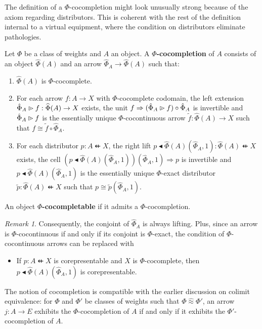 \documentclass[10pt,a4paper]{article}
\newcommand{\To}{\Rightarrow}
\newcommand{\coce}[2]{{\hat{#1}}_{#2}}
\newcommand{\coc}[2]{{\widehat{#1}}(#2)}
\newcommand{\colimeq}{\mathrel{\hat\approx}}
\newcommand{\dfrom}{\nvleftarrow}
\newcommand{\plext}{\mathbin{{\rhd}\mathclap{\mspace{-17.5mu}\cdot}}}
\newcommand{\rift}{\mathbin{\blacktriangleleft}}
\newcommand{\simeqq}{\cong}
\theoremstyle{plain}
\theoremstyle{definition}
\theoremstyle{remark}
\newtheorem{remark}[theorem]{Remark}
\begin{document}
The definition of a $\Phi$-cocompletion might look unusually strong because of the axiom regarding distributors. This is coherent with the rest of the definition internal to a virtual equipment, where the condition on distributors eliminate pathologies.

\begin{definition}
    \label{def:cocomp}
    Let $\Phi$ be a class of weights and $A$ an object. A \textbf{$\Phi$-cocompletion} of $A$ consists of an object $\coc\Phi A$ and an arrow $\coce\Phi A \to \coc\Phi A$ such that:
    \begin{enumerate}
        \item $\coc\Phi A$ is $\Phi$-cocomplete.
        \item For each arrow $f : A \to X$ with $\Phi$-cocomplete codomain, the left extension $\coce\Phi A \plext f : \coc\Phi A \to X$ exists, the unit $f \To (\coce\Phi A \plext f) \circ \coce\Phi A$ is invertible and $\coce\Phi A\plext f$ is the essentially unique $\Phi$-cocontinuous arrow $\widetilde{f} : \coc\Phi A\to X$ such that $f\simeqq \widetilde{f} \circ \coce\Phi A$.
        \item For each distributor $p : A \dfrom X$, the right lift $p\rift\coc\Phi A (\coce\Phi A, 1) : \coc\Phi A \dfrom X$ exists, the cell $(p\rift\coc\Phi A(\coce\Phi A, 1))(\coce\Phi A, 1) \To p$ is invertible and $p\rift\coc\Phi A(\coce\Phi A, 1)$ is the essentially unique $\Phi$-exact distributor $\widetilde{p} : \coc\Phi A\dfrom X$ such that $p\simeqq \widetilde{p}(\coce\Phi A, 1)$.
    \end{enumerate}
    An object \textbf{$\Phi$-cocompletable} if it admits a $\Phi$-cocompletion.
\end{definition}

\begin{remark}
    Consequently, the conjoint of $\coce\Phi A$ is always lifting. Plus, since an arrow is $\Phi$-cocontinuous if and only if its conjoint is $\Phi$-exact, the condition of $\Phi$-cocontinuous arrows can be replaced with
    \begin{itemize}
        \item If $p : A \dfrom X$ is corepresentable and $X$ is $\Phi$-cocomplete, then $p\rift\coc\Phi A(\coce\Phi A, 1)$ is corepresentable.
    \end{itemize}
    The notion of cocompletion is compatible with the earlier discussion on colimit equivalence: for $\Phi$ and $\Phi'$ be classes of weights such that $\Phi\colimeq\Phi'$, an arrow $j : A \to E$ exhibits the $\Phi$-cocompletion of $A$ if and only if it exhibits the $\Phi'$-cocompletion of $A$.
\end{remark}
\end{document}
